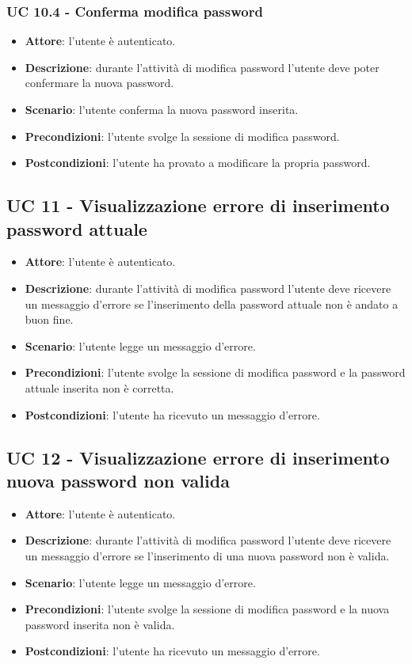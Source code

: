 \subsubsection{UC 10.4 - Conferma modifica password}
\begin{itemize}
    \item \textbf{Attore}: l'utente è autenticato.
    \item \textbf{Descrizione}: durante l'attività di modifica password l'utente deve poter confermare la nuova password.
    \item \textbf{Scenario}: l'utente conferma la nuova password inserita. 
    \item \textbf{Precondizioni}: l'utente svolge la sessione di modifica password.
    \item \textbf{Postcondizioni}: l'utente ha provato a modificare la propria password.
\end{itemize}

\subsection{UC 11 - Visualizzazione errore di inserimento password attuale}
\begin{itemize}
    \item \textbf{Attore}: l'utente è autenticato.
    \item \textbf{Descrizione}: durante l'attività di modifica password l'utente deve ricevere un messaggio d'errore se l'inserimento della password attuale non è andato a buon fine.
    \item \textbf{Scenario}: l'utente legge un messaggio d'errore. 
    \item \textbf{Precondizioni}: l'utente svolge la sessione di modifica password e la password attuale inserita non è corretta.
    \item \textbf{Postcondizioni}: l'utente ha ricevuto un messaggio d'errore.
\end{itemize}

\subsection{UC 12 - Visualizzazione errore di inserimento nuova password non valida}
\begin{itemize}
    \item \textbf{Attore}: l'utente è autenticato.
    \item \textbf{Descrizione}: durante l'attività di modifica password l'utente deve ricevere un messaggio d'errore se l'inserimento di una nuova password non è valida.
    \item \textbf{Scenario}: l'utente legge un messaggio d'errore. 
    \item \textbf{Precondizioni}: l'utente svolge la sessione di modifica password e la nuova password inserita non è valida.
    \item \textbf{Postcondizioni}: l'utente ha ricevuto un messaggio d'errore.

\end{itemize}

